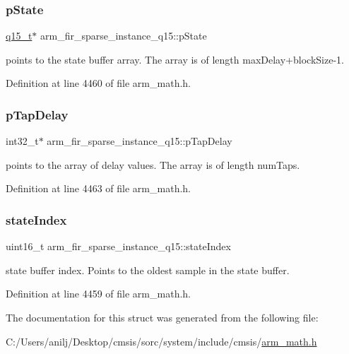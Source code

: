 \subsubsection{\texorpdfstring{p\+State}{pState}}
{\footnotesize\ttfamily \hyperlink{arm__math_8h_ab5a8fb21a5b3b983d5f54f31614052ea}{q15\+\_\+t}$\ast$ arm\+\_\+fir\+\_\+sparse\+\_\+instance\+\_\+q15\+::p\+State}

points to the state buffer array. The array is of length max\+Delay+block\+Size-\/1. 

Definition at line 4460 of file arm\+\_\+math.\+h.

\mbox{\label{structarm__fir__sparse__instance__q15_aeab2855176c6efdb231a73a3672837d5}} 
\subsubsection{\texorpdfstring{p\+Tap\+Delay}{pTapDelay}}
{\footnotesize\ttfamily int32\+\_\+t$\ast$ arm\+\_\+fir\+\_\+sparse\+\_\+instance\+\_\+q15\+::p\+Tap\+Delay}

points to the array of delay values. The array is of length num\+Taps. 

Definition at line 4463 of file arm\+\_\+math.\+h.

\mbox{\label{structarm__fir__sparse__instance__q15_a89487f28cab52637426024005e478985}} 
\subsubsection{\texorpdfstring{state\+Index}{stateIndex}}
{\footnotesize\ttfamily uint16\+\_\+t arm\+\_\+fir\+\_\+sparse\+\_\+instance\+\_\+q15\+::state\+Index}

state buffer index. Points to the oldest sample in the state buffer. 

Definition at line 4459 of file arm\+\_\+math.\+h.



The documentation for this struct was generated from the following file\+:\begin{DoxyCompactItemize}
\item 
C\+:/\+Users/anilj/\+Desktop/cmsis/sorc/system/include/cmsis/\hyperlink{arm__math_8h}{arm\+\_\+math.\+h}\end{DoxyCompactItemize}
